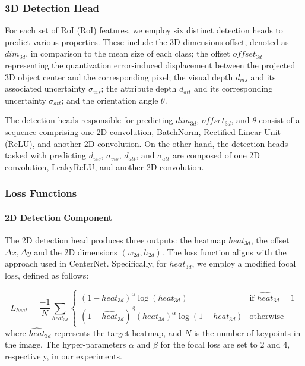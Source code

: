 \documentclass{article}
\begin{document}
\subsubsection{3D Detection Head}\label{3d_detection_head}

For each set of RoI (RoI) features, we employ six distinct detection heads to predict various properties. These include the 3D dimensions offset, denoted as $dim_{3d}$, in comparison to the mean size of each class; the offset $offset_{3d}$ representing the quantization error-induced displacement between the projected 3D object center and the corresponding pixel; the visual depth $d_{vis}$ and its associated uncertainty $\sigma_{vis}$; the attribute depth $d_{att}$ and its corresponding uncertainty $\sigma_{att}$; and the orientation angle $\theta$.

The detection heads responsible for predicting $dim_{3d}$, $offset_{3d}$, and $\theta$ consist of a sequence comprising one 2D convolution, BatchNorm, Rectified Linear Unit (ReLU), and another 2D convolution. On the other hand, the detection heads tasked with predicting $d_{vis}$, $\sigma_{vis}$, $d_{att}$, and $\sigma_{att}$ are composed of one 2D convolution, LeakyReLU, and another 2D convolution.

\subsubsection{Loss Functions}
\paragraph{2D Detection Component} The 2D detection head produces three outputs: the heatmap $heat_{3d}$, the offset $\Delta x, \Delta y$ and the 2D dimensions $(w_{2d}, h_{2d})$. The loss function aligns with the approach used in CenterNet. Specifically, for $heat_{3d}$, we employ a modified focal loss, defined as follows:

\begin{equation}
L_{heat}=\frac{-1}N\sum_{{heat}_{3d}}\begin{cases}(1-{heat}_{3d})^\alpha\log({heat}_{3d})&\text{if }\hat{heat}_{3d}=1\\(1-\hat{heat}_{3d})^\beta({heat}_{3d})^\alpha \log(1-{heat}_{3d}) &\text{otherwise}\end{cases}
\end{equation}
where $\hat{heat}_{3d}$ represents the target heatmap, and $N$ is the number of keypoints in the image. The hyper-parameters $\alpha$ and $\beta$ for the focal loss are set to 2 and 4, respectively, in our experiments.
\end{document}
